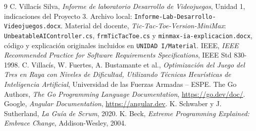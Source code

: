 \documentclass[12pt,a4paper]{article}
\begin{document}
\begin{thebibliography}{9}
 C. Villacís Silva, \emph{Informe de laboratorio Desarrollo de Videojuegos}, Unidad 1, indicaciones del Proyecto 3. Archivo local: \texttt{Informe-Lab-Desarrollo-Videojuegos.docx}.
 Material del docente, \emph{Tic-Tac-Toe-Version-MiniMax}: \texttt{UnbeatableAIController.cs}, \texttt{frmTicTacToe.cs} y \texttt{minmax-ia-explicacion.docx}, código y explicación originales incluidos en \texttt{UNIDAD I/Material}.
 IEEE, \emph{IEEE Recommended Practice for Software Requirements Specifications}, IEEE Std 830-1998.
 C. Villacís, W. Fuertes, A. Bustamante et al., \emph{Optimización del Juego del Tres en Raya con Niveles de Dificultad, Utilizando Técnicas Heurísticas de Inteligencia Artificial}, Universidad de las Fuerzas Armadas -- ESPE.
 The Go Authors, \emph{The Go Programming Language Documentation}, \url{https://go.dev/doc/}.
 Google, \emph{Angular Documentation}, \url{https://angular.dev}.
 K. Schwaber y J. Sutherland, \emph{La Guía de Scrum}, 2020.
 K. Beck, \emph{Extreme Programming Explained: Embrace Change}, Addison-Wesley, 2004.
\end{thebibliography}
\end{document}
